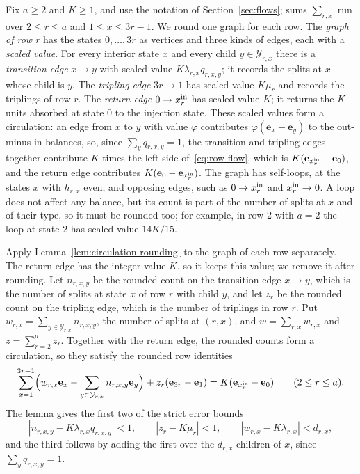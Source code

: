 Fix \(a\ge2\) and \(K\ge1\), and use the notation of
Section~\ref{sec:flows}; sums \(\sum_{r,x}\) run over \(2\le r\le a\) and
\(1\le x\le3r-1\). We round one graph for each row. The \emph{graph of
row \(r\)} has the states \(0,\ldots,3r\) as vertices and three kinds of
edges, each with a \emph{scaled value}. For every interior state \(x\) and
every child \(y\in\mathcal Y_{r,x}\) there is a \emph{transition edge}
\(x\to y\) with scaled value \(K\lambda_{r,x}q_{r,x,y}\); it records the
splits at \(x\) whose child is \(y\). The \emph{tripling edge} \(3r\to1\) has
scaled value \(K\mu_r\) and records the triplings of row \(r\). The
\emph{return edge} \(0\to x^{\mathrm{in}}_r\) has scaled value \(K\); it returns the
\(K\) units absorbed at state \(0\) to the injection state. These scaled
values form a circulation: an edge from \(x\) to \(y\) with value \(\varphi\)
contributes \(\varphi(\mathbf e_x-\mathbf e_y)\) to the out-minus-in
balances, so, since \(\sum_yq_{r,x,y}=1\), the transition and tripling edges
together contribute \(K\) times the left side of~\eqref{eq:row-flow}, which
is \(K(\mathbf e_{x^{\mathrm{in}}_r}-\mathbf e_0)\), and the return edge contributes
\(K(\mathbf e_0-\mathbf e_{x^{\mathrm{in}}_r})\). The graph has self-loops, at the
states \(x\) with \(h_{r,x}\) even, and opposing edges, such as
\(0\to x^{\mathrm{in}}_r\) and \(x^{\mathrm{in}}_r\to0\). A loop does not affect any balance,
but its count is part of the number of splits at \(x\) and of their type,
so it must be rounded too; for example, in row \(2\) with \(a=2\) the loop
at state \(2\) has scaled value \(14K/15\).

Apply Lemma~\ref{lem:circulation-rounding} to the graph of each row
separately. The return edge has the integer value \(K\), so it keeps this
value; we remove it after rounding. Let \(n_{r,x,y}\) be the rounded count
on the transition edge \(x\to y\), which is the number of splits at state
\(x\) of row \(r\) with child \(y\), and let \(z_r\) be the rounded count on
the tripling edge, which is the number of triplings in row \(r\). Put
\(w_{r,x}=\sum_{y\in\mathcal Y_{r,x}}n_{r,x,y}\), the number of splits at
\((r,x)\), and \(\bar w=\sum_{r,x}w_{r,x}\) and \(\bar z=\sum_{r=2}^az_r\).
Together with the return edge, the rounded counts form a circulation, so
they satisfy the rounded row identities
\begin{equation}\label{eq:rounded-row-flow}
 \sum_{x=1}^{3r-1}
 \Bigl(w_{r,x}\mathbf e_x
       -\sum_{y\in\mathcal Y_{r,x}}n_{r,x,y}\mathbf e_y\Bigr)
 +z_r(\mathbf e_{3r}-\mathbf e_1)
 =K(\mathbf e_{x^{\mathrm{in}}_r}-\mathbf e_0)
 \qquad(2\le r\le a).
\end{equation}
The lemma gives the first two of the strict error bounds
\begin{equation}\label{eq:rounded-edge-errors}
 |n_{r,x,y}-K\lambda_{r,x}q_{r,x,y}|<1,
 \qquad |z_r-K\mu_r|<1,
 \qquad |w_{r,x}-K\lambda_{r,x}|<d_{r,x},
\end{equation}
and the third follows by adding the first over the \(d_{r,x}\) children of
\(x\), since \(\sum_yq_{r,x,y}=1\).

